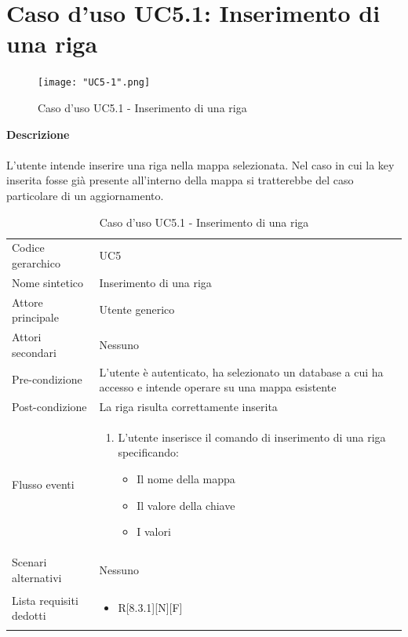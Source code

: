 \documentclass[a4paper]{report}
\begin{document}
	 \section{Caso d'uso UC5.1: Inserimento di una riga}
	 \begin{figure}[H]
			\centering
			\texttt{[image: "UC5-1".png]}
			\caption{Caso d'uso UC5.1 - Inserimento di una riga}
		\end{figure}
	 \textbf{Descrizione} \\ \\
	 L'utente intende inserire una riga nella mappa selezionata. Nel caso in cui la key inserita
	 fosse già presente all'interno della mappa si tratterebbe del caso particolare di un aggiornamento.
		\begin{table}[H]
		\begin{tabularx}{\textwidth}{X | X}\toprule
			\rowcolor{orange!65}Codice gerarchico & UC5\\
			Nome sintetico & Inserimento di una riga\\
			\rowcolor{orange!65}Attore principale & Utente generico\\
			Attori secondari & Nessuno \\
			\rowcolor{orange!65}Pre-condizione & L'utente è autenticato, ha selezionato un database a cui ha 
			accesso e intende operare su una mappa esistente \\
			Post-condizione & La riga risulta correttamente inserita\\
			\rowcolor{orange!65}Flusso eventi & \begin{enumerate}
			\item L'utente inserisce il comando di inserimento di una riga specificando:
			\begin{itemize}
				\item Il nome della mappa
				\item Il valore della chiave
				\item I valori
			\end{itemize}
			\end{enumerate} \\
			Scenari alternativi & Nessuno \\
			\rowcolor{orange!65}Lista requisiti dedotti & \begin{itemize}
				\item R[8.3.1][N][F]
				\end{itemize} \\
			\bottomrule
		\end{tabularx}
		\caption{Caso d'uso UC5.1 - Inserimento di una riga}
	 \end{table}
\end{document}
